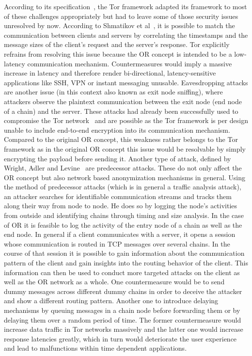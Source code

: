 \documentclass{sig-alternate}
\begin{document}
According to its specification~\cite{torspec}, the Tor framework adapted its framework to most of these challenges appropriately but had to leave some of those security issues unresolved by now. According to Shmatikov et al~\cite{shmatikov2006timing}, it is  possible to match the communication between clients and servers by correlating the timestamps and the message sizes of the client's request and the server's response. Tor explicitly refrains from resolving this issue because the OR concept is intended to be a low-latency communication mechanism. Countermeasures would imply a massive increase in latency and therefore render bi-directional, latency-sensitive applications like SSH, VPN or instant messaging unusable.
Eavesdropping attacks are another issue (in this context also known as exit node sniffing), where attackers observe the plaintext communication between the exit node (end node of a chain) and the server. These attacks had already been successfully used to compromise the Tor network~\cite{eavesdrop} and are possible as the Tor framework is per design unable to include end-to-end encryption into its communication mechanism. Compared to the original OR concept, this weakness rather belongs to the Tor framework as in the original OR concept this issue would be resolvable by simply encrypting the payload before sending it.
Another type of attack, defined by Wright, Adler and Levine~\cite{wright2004predecessor} are predecessor attacks. These do not only affect the OR concept but also network based anonymization mechanisms in general. Using the method of predecessor attacks (which is in general a traffic analysis attack), an attacker searches for identifiable communication streams and tracks them along their way from node to node. He does so by logging the node's activities from outside and identifying chains through timing and size analysis. In the case of OR it is feasible to log the activity of the entry node of a chain as well as the end node. In general if a client communicates with a server, it opens a session whose communication is routed in TCP messages over several chains. In the course of that session it is possible to gain information about the communication pattern of the client and gain insights into the routing behavior of the client. This information can then be used to conduct more targeted attacks on the client as well as the OR network as a whole. One countermeasure would be to send dummy messages across different dummy chains in order to deceive the attacker and show a different routing pattern. Another one to introduce delaying mechanisms by queuing messages in a chain node before forwarding them or by delaying them over a random period of time. The former countermeasure would increase data traffic in Tor networks massively and the latter one would increase response latencies greatly, which in turn would deteriorate the user experience and lead to malfunctions within time dependent applications. 
\end{document}
